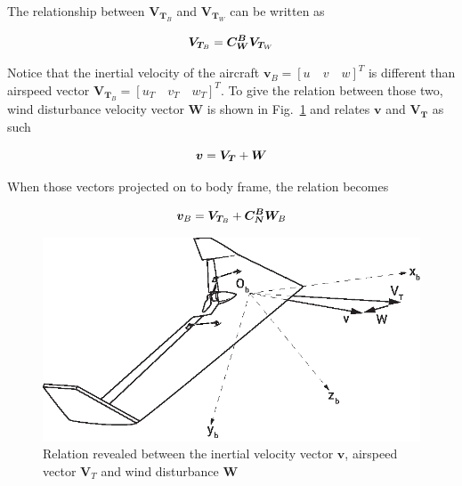 The relationship between $\bm{V}_{\bm{T}_B}$ and $\bm{V}_{\bm{T}_W}$ can be written as \cite{ducard2009fault}

\begin{equation}{\label{eqn:airspeedVectorTransformation}}
\bm{V}_{\bm{T}_B}=\bm{C_W^B}\bm{V}_{\bm{T}_W}
\end{equation}

Notice that the inertial velocity of the aircraft $\bm{v}_B = {[u \quad v \quad w]}^T$ is different than airspeed vector $\bm{V}_{\bm{T}_B} = {[u_T \quad v_T \quad w_T ]}^T$. 
To give the relation between those two, wind disturbance velocity vector $\bm{W}$ is shown in Fig.~\ref{fig:windDisturbance} and relates $\bm{v}$ and $\bm{V}_{\bm{T}} $ as such 

\begin{equation}{\label{eqn:inertialVelocityAirspeedVectorWind}}
\bm{v}=\bm{V_T} + \bm{W}
\end{equation}

When those vectors projected on to body frame, the relation becomes

\begin{equation}{\label{eqn:inertialVelocityAirspeedVectorWind}}
\bm{v}_B=\bm{V}_{\bm{T}_B} + \bm{C_N^B} \bm{W}_B
\end{equation}

\begin{figure}
\begin{center}
\includegraphics[width=13cm]{figures/ZagiWindDisturbance}    %
\caption{Relation revealed between the inertial velocity vector $\bm{v}$, airspeed vector $\bm{V}_T$ and wind disturbance $\bm{W}$ \cite{ducard2009fault}} 
\label{fig:windDisturbance}
\end{center}
\end{figure}

